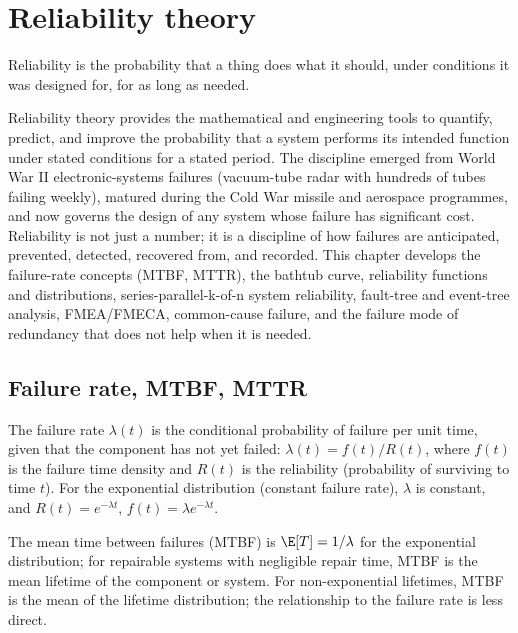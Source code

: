 \chapter{Reliability theory}
\label{vol09:ch07}

\epigraph{Reliability is the probability that a thing does what it should, under conditions it was designed for, for as long as needed.}{}


\noindent
Reliability theory provides the mathematical and engineering tools to quantify, predict, and improve the probability that a system performs its intended function under stated conditions for a stated period. The discipline emerged from World War II electronic-systems failures (vacuum-tube radar with hundreds of tubes failing weekly), matured during the Cold War missile and aerospace programmes, and now governs the design of any system whose failure has significant cost. Reliability is not just a number; it is a discipline of how failures are anticipated, prevented, detected, recovered from, and recorded. This chapter develops the failure-rate concepts (MTBF, MTTR), the bathtub curve, reliability functions and distributions, series-parallel-k-of-n system reliability, fault-tree and event-tree analysis, FMEA/FMECA, common-cause failure, and the failure mode of redundancy that does not help when it is needed.

\section{Failure rate, MTBF, MTTR}

The failure rate $\lambda(t)$ is the conditional probability of failure per unit time, given that the component has not yet failed: $\lambda(t) = f(t)/R(t)$, where $f(t)$ is the failure time density and $R(t)$ is the reliability (probability of surviving to time $t$). For the exponential distribution (constant failure rate), $\lambda$ is constant, and $R(t) = e^{-\lambda t}$, $f(t) = \lambda e^{-\lambda t}$.

The mean time between failures (MTBF) is $\E[T] = 1/\lambda$ for the exponential distribution; for repairable systems with negligible repair time, MTBF is the mean lifetime of the component or system. For non-exponential lifetimes, MTBF is the mean of the lifetime distribution; the relationship to the failure rate is less direct.

